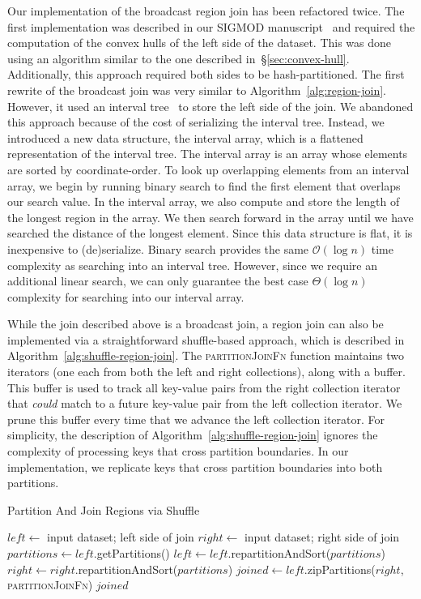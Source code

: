 \documentclass[phd]{ucbthesis}
\begin{document}
Our implementation of the broadcast region join has been refactored twice. The
first implementation was described in our SIGMOD manuscript~\cite{nothaft15} and
required the computation of the convex hulls of the left side of the dataset.
This was done using an algorithm similar to the one described
in~\S\ref{sec:convex-hull}. Additionally, this approach required both sides to
be hash-partitioned. The first rewrite of the broadcast join was very similar to
Algorithm~\ref{alg:region-join}. However, it used an interval
tree~\cite{samet90} to store the left side of the join. We abandoned this
approach because of the cost of serializing the interval tree. Instead, we
introduced a new data structure, the interval array, which is a flattened
representation of the interval tree. The interval array is an array whose
elements are sorted by coordinate-order. To look up overlapping elements from an
interval array, we begin by running binary search to find the first element that
overlaps our search value. In the interval array, we also compute and store the
length of the longest region in the array. We then search forward in the array
until we have searched the distance of the longest element. Since this data
structure is flat, it is inexpensive to (de)serialize. Binary search provides
the same $\mathcal{O}(\log n)$ time complexity as searching into an interval
tree. However, since we require an additional linear search, we can only
guarantee the best case $\Theta(\log n)$ complexity for searching into our
interval array.

While the join described above is a broadcast join, a region join can also be
implemented via a straightforward shuffle-based approach, which is described in
Algorithm~\ref{alg:shuffle-region-join}. The \textsc{partitionJoinFn} function
maintains two iterators (one each from both the left and right collections),
along with a buffer. This buffer is used to track all key-value pairs from the
right collection iterator that \emph{could} match to a future key-value pair
from the left collection iterator. We prune this buffer every time that we
advance the left collection iterator. For simplicity, the description of
Algorithm~\ref{alg:shuffle-region-join} ignores the complexity of processing
keys that cross partition boundaries. In our implementation, we replicate keys
that cross partition boundaries into both partitions.

\begin{algorithm}
\caption{Partition And Join Regions via Shuffle}
\label{alg:shuffle-region-join}
\begin{algorithmic}
\STATE $left \leftarrow$ input dataset; left side of join
\STATE $right \leftarrow$ input dataset; right side of join
\STATE $partitions \leftarrow left$.getPartitions()
\STATE $left \leftarrow left$.repartitionAndSort($partitions$)
\STATE $right \leftarrow right$.repartitionAndSort($partitions$)
\STATE $joined \leftarrow left$.zipPartitions($right$, \textsc{partitionJoinFn})
\RETURN $joined$
\end{algorithmic}
\end{algorithm}
\end{document}
